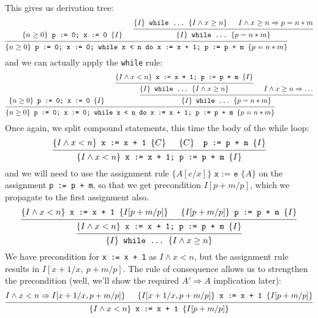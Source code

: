 \documentclass[11pt]{article}
\begin{document}
This gives us derivation tree:
\[
\begin{prooftree}
\hypo{\{ n \geq 0 \} \texttt{~p := 0; x := 0~} \{ I \}}
  \hypo{\{I \} \texttt{~while \ldots ~} \{ I \wedge x \geq n \} }
  \hypo{I \wedge x \geq n \Rightarrow p = n * m }
  \infer2{\{I \} \texttt{~while \ldots ~}\{ p = n * m \}}
\infer2{\{ n \geq 0 \} \texttt{~p := 0; x := 0; while x < n do x := x + 1; p := p + m~} \{ p = n * m \}}
\end{prooftree}
\]
and we can actually apply the \texttt{while} rule:
\[
\begin{prooftree}
\hypo{\{ n \geq 0 \} \texttt{~p := 0; x := 0~} \{ I \}}
  \hypo{\{I \wedge x < n \} \texttt{~x := x + 1; p := p + m~} \{ I \} }
  \infer1{\{I \} \texttt{~while \ldots ~} \{ I \wedge x \geq n \} }
  \hypo{I \wedge x \geq n \Rightarrow \ldots }
  \infer2{\{I \} \texttt{~while \ldots ~}\{ p = n * m \}}
\infer2{\{ n \geq 0 \} \texttt{~p := 0; x := 0; while x < n do x := x + 1; p := p + m~} \{ p = n * m \}}
\end{prooftree}
\]
Once again, we split compound statements, this time the body of the while loop:
\[
\begin{prooftree}
\hypo{\{ I \wedge x < n \} \texttt{~x := x + 1~} \{ C \}}
\hypo{\{ C \} \texttt{~ p := p + m~} \{ I \}}
\infer2{\{ I \wedge x < n \} \texttt{~x := x + 1; p := p + m~} \{ I \}}
\end{prooftree}
\]
and we will need to use the assignment rule $\{ A[e/x] \} \texttt{~x := e~} \{ A \}$ 
on the assignment \texttt{p := p + m}, so that we get precondition $I[p+m/p]$,
which we propagate to the first assignment also.
\[
\begin{prooftree}
  \hypo{\{I \wedge x < n\} \texttt{~x := x + 1~} \{ I[p+m/p] \}}
  \hypo{\{I[p+m/p]\} \texttt{~p := p + m~} \{ I \}}
  \infer2{\{I \wedge x < n \} \texttt{~x := x + 1; p := p + m~} \{ I \} }
  \infer1{\{I \} \texttt{~while \ldots ~} \{ I \wedge x \geq n \} }
\end{prooftree}
\]
We have precondition for \texttt{x := x + 1} as $I \wedge x < n$, but
the assignment rule results in $I[\mbox{$x+1$}/x, ~ \mbox{$p+m$}/p]$.
The rule of consequence allows us to strengthen the precondition (well, we'll show
the required $A' \Rightarrow A$ implication later):
\[
\begin{prooftree}
  \hypo{I \wedge x < n \Rightarrow I[x+1/x, p+m/p] \}}
  \hypo{\{I[x+1/x, p+m/p]\} \texttt{~x := x + 1~} \{ I[p+m/p] \}}
\infer2{\{I \wedge x < n\} \texttt{~x := x + 1~} \{ I[p+m/p] \}}
\end{prooftree}
\]
\end{document}
